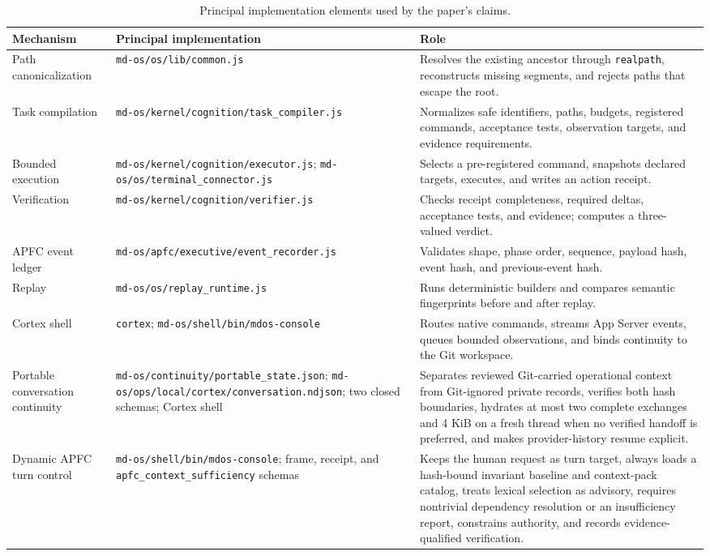 \documentclass[10pt,twocolumn]{article}
\theoremstyle{definition}
\theoremstyle{plain}
\theoremstyle{remark}
\newcommand{\file}[1]{\nolinkurl{#1}}
\begin{document}
\begin{table}[!t]
\centering
\caption{Principal implementation elements used by the paper's claims.}
\label{tab:implementation}
\scriptsize
\begin{tabularx}{\textwidth}{@{}p{}p{}X@{}}
\toprule
Mechanism & Principal implementation & Role \\
\midrule
Path canonicalization & \file{md-os/os/lib/common.js} & Resolves the existing ancestor through \file{realpath}, reconstructs missing segments, and rejects paths that escape the root. \\
Task compilation & \file{md-os/kernel/cognition/task_compiler.js} & Normalizes safe identifiers, paths, budgets, registered commands, acceptance tests, observation targets, and evidence requirements. \\
Bounded execution & \file{md-os/kernel/cognition/executor.js}; \file{md-os/os/terminal_connector.js} & Selects a pre-registered command, snapshots declared targets, executes, and writes an action receipt. \\
Verification & \file{md-os/kernel/cognition/verifier.js} & Checks receipt completeness, required deltas, acceptance tests, and evidence; computes a three-valued verdict. \\
APFC event ledger & \file{md-os/apfc/executive/event_recorder.js} & Validates shape, phase order, sequence, payload hash, event hash, and previous-event hash. \\
Replay & \file{md-os/os/replay_runtime.js} & Runs deterministic builders and compares semantic fingerprints before and after replay. \\
Cortex shell & \file{cortex}; \file{md-os/shell/bin/mdos-console} & Routes native commands, streams App Server events, queues bounded observations, and binds continuity to the Git workspace. \\
Portable conversation continuity & \file{md-os/continuity/portable\_state.json}; \file{md-os/ops/local/cortex/conversation.ndjson}; two closed schemas; Cortex shell & Separates reviewed Git-carried operational context from Git-ignored private records, verifies both hash boundaries, hydrates at most two complete exchanges and 4 KiB on a fresh thread when no verified handoff is preferred, and makes provider-history resume explicit. \\
Dynamic APFC turn control & \file{md-os/shell/bin/mdos-console}; frame, receipt, and \file{apfc\_context\_sufficiency} schemas & Keeps the human request as turn target, always loads a hash-bound invariant baseline and context-pack catalog, treats lexical selection as advisory, requires nontrivial dependency resolution or an insufficiency report, constrains authority, and records evidence-qualified verification. \\

\end{tabularx}
\end{table}
\end{document}
